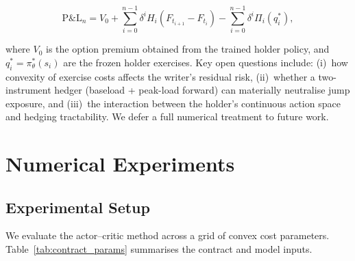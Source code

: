 \documentclass[a4paper,fleqn]{cas-dc}
\begin{document}
\begin{equation}
\label{eq:pnl}
\text{P\&L}_n = V_0 + \sum_{i=0}^{n-1} \delta^i H_i (F_{t_{i+1}} - F_{t_i})
               - \sum_{i=0}^{n-1} \delta^i \Pi_i(q^*_i),
\end{equation}

where $V_0$ is the option premium obtained from the trained holder policy, and $q^*_i = \pi^*_\theta(s_i)$ are the frozen holder exercises.
Key open questions include: (i)~how convexity of exercise costs affects the writer's residual risk, (ii)~whether a two-instrument hedger (baseload + peak-load forward) can materially neutralise jump exposure, and (iii)~the interaction between the holder's continuous action space and hedging tractability.
We defer a full numerical treatment to future work.


\section{Numerical Experiments}
\label{sec:experiments}

\subsection{Experimental Setup}

We evaluate the actor--critic method across a grid of convex cost parameters. Table~\ref{tab:contract_params} summarises the contract and model inputs.
\end{document}
